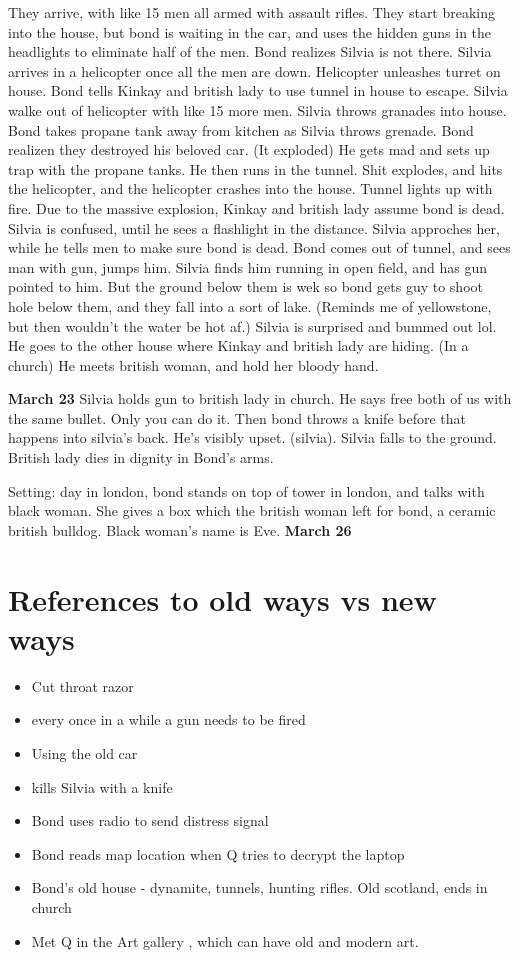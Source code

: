 \documentclass{article}
\begin{document}
    They arrive, with like 15 men all armed with assault rifles. They start breaking into the house,
    but bond is waiting in the  car, and uses the hidden guns in the headlights to eliminate half of the men.
    Bond realizes Silvia is not there. Silvia arrives in a helicopter once all the men
    are down. Helicopter unleashes turret on house. Bond tells Kinkay and british lady to use
    tunnel in house to escape. Silvia walke out of helicopter with like 15 more men.
    Silvia throws granades into house. Bond takes propane tank away from kitchen as Silvia throws grenade.
    Bond realizen they destroyed his beloved car. (It exploded) He gets mad and sets up trap with the propane tanks. He then runs in the tunnel.
    Shit explodes, and hits the helicopter, and the helicopter crashes into the house.
    Tunnel lights up with fire. Due to the massive explosion, Kinkay and british lady assume bond is dead.
    Silvia is confused, until he sees a flashlight in the distance. Silvia approches her, while he tells men to
    make sure bond is dead. Bond comes out of tunnel, and sees man with gun, jumps him. Silvia finds him running in
    open field, and has gun pointed to him. But the ground below them is wek so bond gets guy to shoot hole below them,
    and they fall into a sort of lake. (Reminds me of yellowstone, but then wouldn't the water be hot af.)
    Silvia is surprised and bummed out lol. He goes to the other house where Kinkay and british lady are hiding. (In a church)
    He meets british woman, and hold her bloody hand.

    \textbf{March 23}
    Silvia holds gun to british lady in church. He says free both of us with the same bullet.
    Only you can do it. Then bond throws a knife before that happens into silvia's back.
    He's visibly upset. (silvia). Silvia falls to the ground. British lady dies in dignity in Bond's arms.

    Setting: day in london, bond stands on top of tower in london, and talks with black woman.
    She gives a box which the british woman left for bond, a ceramic british bulldog.
    Black woman's name is Eve.
    \textbf{March 26}
    \section{References to old ways vs new ways}
    \begin{itemize}
      \item Cut throat razor
      \item every once in a while a gun needs to be fired
      \item Using the old car
      \item kills Silvia with a knife
      \item Bond uses radio to send distress signal
      \item Bond reads map location when Q tries to decrypt the laptop
      \item Bond's old house - dynamite, tunnels, hunting rifles. Old scotland, ends in church
      \item Met Q in the Art gallery , which can have old and modern art.
    \end{itemize}
\end{document}
